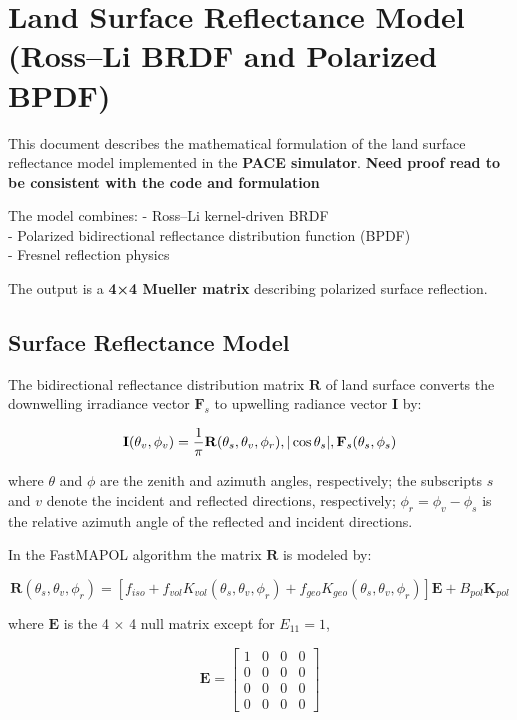 \documentclass[
  letterpaper,
  open=any]{scrbook}
\begin{document}
\chapter{Land Surface Reflectance Model (Ross--Li BRDF and Polarized
BPDF)}\label{land-surface-reflectance-model-rossli-brdf-and-polarized-bpdf}

This document describes the mathematical formulation of the land surface
reflectance model implemented in the \textbf{PACE simulator}.
\textbf{Need proof read to be consistent with the code and formulation}

The model combines: - Ross--Li kernel-driven BRDF\\
- Polarized bidirectional reflectance distribution function (BPDF)\\
- Fresnel reflection physics

The output is a \textbf{4×4 Mueller matrix} describing polarized surface
reflection.

\section{Surface Reflectance Model}\label{surface-reflectance-model}

The bidirectional reflectance distribution matrix \(\mathbf{R}\) of land
surface converts the downwelling irradiance vector \(\mathbf{F}_s\) to
upwelling radiance vector \(\mathbf{I}\) by:

\[
\mathbf{I}(\theta_v,\phi_v)= \frac{1}{\pi}\mathbf{R}(\theta_s,\theta_v,\phi_r) \\, |\cos\theta_s| \\, \mathbf{F}_s(\theta_s,\phi_s) 
\]

where \(\theta\) and \(\phi\) are the zenith and azimuth angles,
respectively; the subscripts \(s\) and \(v\) denote the incident and
reflected directions, respectively; \(\phi_r=\phi_v-\phi_s\) is the
relative azimuth angle of the reflected and incident directions.

In the FastMAPOL algorithm the matrix \(\mathbf{R}\) is modeled by:

\[
\mathbf{R}(\theta_s,\theta_v,\phi_r) =
\left[
f_{iso}
+
f_{vol} K_{vol}(\theta_s,\theta_v,\phi_r)
+
f_{geo} K_{geo}(\theta_s,\theta_v,\phi_r)
\right]\mathbf{E}
+
B_{pol}\mathbf{K}_{pol}
\]

where \(\mathbf{E}\) is the 4 \(\times\) 4 null matrix except for
\(E_{11}=1\),

\[
\mathbf{E} =
\begin{bmatrix}
1 & 0 & 0 & 0 \\
0 & 0 & 0 & 0 \\
0 & 0 & 0 & 0 \\
0 & 0 & 0 & 0
\end{bmatrix}
\]
\end{document}
